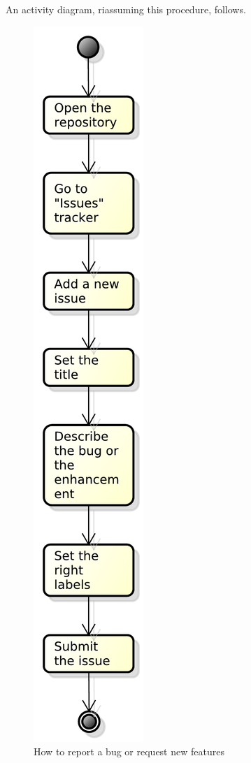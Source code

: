 An activity diagram, riassuming this procedure, follows.
\begin{figure}[H]
	\centering
	\includegraphics[scale=0.4]{Pics/ReportIssue.pdf}
	\caption{How to report a bug or request new features}
\end{figure}
